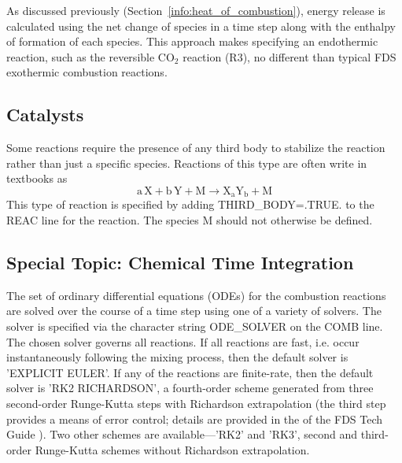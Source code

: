 \documentclass[11pt]{book}
\begin{document}
As discussed previously (Section~\ref{info:heat_of_combustion}), energy release is calculated using the net change of species in a time step along with the enthalpy of formation of each species. This approach makes specifying an endothermic reaction, such as the reversible CO$_2$ reaction (R3), no different than typical FDS exothermic combustion reactions.

\subsection{Catalysts}

Some reactions require the presence of any third body to stabilize the reaction rather than just a specific species.  Reactions of this type are often write in textbooks as
\begin{equation}\label{eq:third_body}
\mathrm{a \, X + b \, Y + M \rightarrow X_aY_b + M }
\end{equation}
This type of reaction is specified by adding {\ct THIRD\_BODY=.TRUE.} to the {\ct REAC} line for the reaction.  The species M should not otherwise be defined.



\subsection{Special Topic: Chemical Time Integration}
\label{info:chem_integration}

The set of ordinary differential equations (ODEs) for the combustion reactions are solved over the course of a time step using one of a variety of solvers. The solver is specified via the character string {\ct ODE\_SOLVER} on the {\ct COMB} line. The chosen solver governs all reactions. If all reactions are fast, i.e. occur instantaneously following the mixing process, then the default solver is {\ct 'EXPLICIT EULER'}. If any of the reactions are finite-rate, then the default solver is {\ct 'RK2 RICHARDSON'}, a fourth-order scheme generated from three second-order Runge-Kutta steps with Richardson extrapolation (the third step provides a means of error control; details are provided in the of the FDS Tech Guide \cite{FDS_Math_Guide}). Two other schemes are available---{\ct 'RK2'} and {\ct 'RK3'}, second and third-order Runge-Kutta schemes without Richardson extrapolation.
\end{document}
